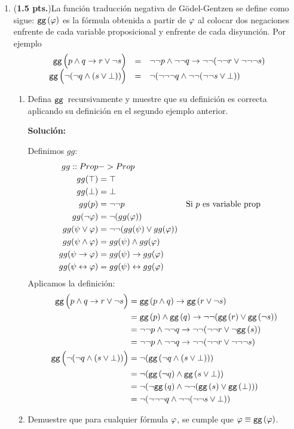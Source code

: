 \documentclass[11pt,letterpaper]{article}
\begin{document}
\begin{enumerate}
\item (\textbf{1.5 pts.})La función traducción negativa de Gödel-Gentzen se define como sigue: ${\tt gg\,}(\varphi)$ es la fórmula obtenida a partir de $\varphi$ al colocar dos negaciones enfrente de cada variable proposicional y enfrente de cada disyunción. Por ejemplo
  \[
    \begin{array}{rcl}
    {\tt gg\,}\Big(p\land q\to r\lor \neg s\Big) &=& \neg\neg p\land \neg\neg q\to \neg\neg(\neg\neg r\lor \neg\neg\neg s)\\
      {\tt gg\,}\Big(\neg(\neg q\land (s\lor \bot))\Big) &=& \neg(\neg\neg\neg q\land \neg\neg(\neg\neg s\lor \bot))
    \end{array}
  \]

  \begin{enumerate}
  \item Defina ${\tt gg\,}$ recursivamente y muestre que su definición es correcta aplicando su definición en el segundo ejemplo anterior.
    
    \hfill\break
    {\bf Solución:}

    Definimos $gg$:
    \ttfamily
    \begin{align*}
      gg :: Prop &-> Prop\\
      gg(\top) &= \top \\
      gg(\bot) &= \bot \\
      gg(p) &= \neg\neg p & &\text{Si $p$ es variable prop} \\
      gg(\neg\varphi) &= \neg(gg (\varphi))\\
      gg(\psi \lor \varphi) &= \neg\neg(gg(\psi)\lor gg(\varphi))\\
      gg(\psi \land \varphi) &= gg(\psi) \land gg(\varphi)\\
      gg(\psi \rightarrow \varphi) &= gg(\psi) \rightarrow gg(\varphi)\\
      gg(\psi \leftrightarrow \varphi) &= gg(\psi) \leftrightarrow gg(\varphi)\\
    \end{align*}
    Aplicamos la definición:
    \begin{align*}
      {\tt gg\,}\Big(p\land q\to r\lor \neg s\Big) &= {\tt gg\,}(p\land q)\to
      {\tt gg\,}(r\lor \neg s)\\
      &= {\tt gg\,}(p)\land {\tt gg\,}(q)\to \neg\neg({\tt gg\,}(r)\lor {\tt gg\,}(\neg s))\\
      &= \neg\neg p\land \neg\neg q\to \neg\neg(\neg\neg r\lor \neg{\tt gg\,}(s))\\
      &= \neg\neg p\land \neg\neg q\to \neg\neg(\neg\neg r\lor \neg\neg\neg s) \\
      {\tt gg\,}\Big(\neg(\neg q\land (s\lor \bot))\Big) &=
      \neg({\tt gg\,}(\neg q\land (s\lor \bot))) \\
      &= \neg({\tt gg\,}(\neg q)\land {\tt gg\,}(s\lor \bot)) \\
      &= \neg(\neg{\tt gg\,}(q)\land \neg\neg({\tt gg\,}(s)\lor {\tt gg\,}(\bot))) \\
      &= \neg(\neg\neg\neg q\land \neg\neg(\neg\neg s\lor \bot))
    \end{align*}
    \rmfamily
  \item Demuestre que para cualquier fórmula $\varphi$, se cumple que $\varphi\equiv {\tt gg\,}(\varphi)$.


\end{enumerate}
\end{enumerate}
\end{document}
